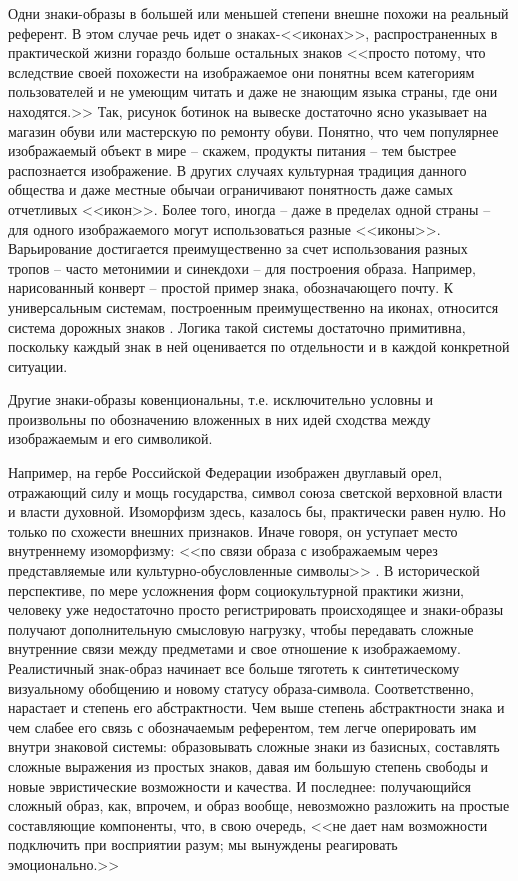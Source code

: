 Одни знаки-образы в большей или меньшей степени внешне похожи на реальный референт.
В этом случае речь идет о знаках-<<иконах>>, распространенных в практической жизни
гораздо больше остальных знаков <<просто потому, что вследствие своей похожести на
изображаемое они понятны всем категориям пользователей и не умеющим читать и даже
не знающим языка страны, где они находятся.>> \autocite[][55]{solomonik1995}
Так, рисунок ботинок на вывеске достаточно ясно указывает на магазин обуви или мастерскую по
ремонту обуви. Понятно, что чем популярнее изображаемый объект в мире -- скажем,
продукты питания -- тем быстрее распознается изображение. В других случаях культурная
традиция данного общества и даже местные обычаи ограничивают понятность даже
самых отчетливых <<икон>>. Более того, иногда -- даже в пределах одной страны -- для
одного изображаемого могут использоваться разные <<иконы>>. Варьирование достигается
преимущественно за счет использования разных тропов -- часто метонимии и синекдохи --
для построения образа. Например, нарисованный конверт -- простой пример знака, обозначающего почту.
К универсальным системам, построенным преимущественно на иконах, относится система
дорожных знаков \autocite[][56-58]{solomonik1995}. Логика такой системы достаточно
примитивна, поскольку каждый знак в ней оценивается по отдельности и в каждой
конкретной ситуации.

Другие знаки-образы ковенциональны, т.е. исключительно условны и произвольны
по обозначению вложенных в них идей сходства между изображаемым и его символикой.

Например, на гербе Российской Федерации изображен двуглавый орел,
отражающий силу и мощь государства, символ союза светской верховной власти  и власти духовной.
Изоморфизм здесь, казалось бы, практически равен нулю. Но только по
схожести внешних признаков. Иначе говоря, он уступает место внутреннему изоморфизму:
<<по связи образа с изображаемым через представляемые или культурно-обусловленные
символы>> \autocite[][61]{solomonik1995}. В исторической перспективе, по мере
усложнения форм социокультурной практики жизни, человеку уже недостаточно просто
регистрировать происходящее и знаки-образы получают дополнительную смысловую нагрузку,
чтобы передавать сложные внутренние связи между предметами и свое отношение к изображаемому.
Реалистичный знак-образ начинает все больше тяготеть к синтетическому визуальному обобщению
и новому статусу образа-символа. Соответственно, нарастает и степень его абстрактности.
Чем выше степень абстрактности знака и чем слабее его связь с обозначаемым
референтом, тем легче оперировать им внутри знаковой системы: образовывать
сложные знаки из базисных, составлять сложные выражения из простых знаков, давая
им большую степень свободы и новые эвристические возможности и качества.
И последнее: получающийся сложный образ, как,  впрочем,  и образ вообще, невозможно
разложить на простые составляющие компоненты, что, в свою очередь, <<не дает нам
возможности подключить при восприятии разум; мы вынуждены реагировать
эмоционально.>> \autocite[][77]{solomonik1995}

